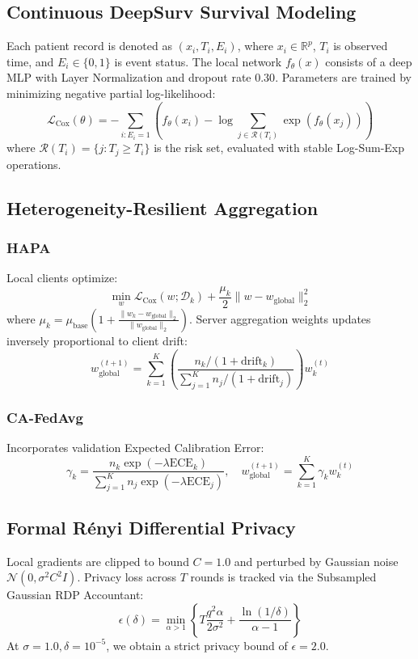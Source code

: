 \documentclass[journal,10pt,twocolumn]{IEEEtran}
\begin{document}
\subsection{Continuous DeepSurv Survival Modeling}
Each patient record is denoted as $(x_i, T_i, E_i)$, where $x_i \in \mathbb{R}^p$, $T_i$ is observed time, and $E_i \in \{0, 1\}$ is event status. The local network $f_\theta(x)$ consists of a deep MLP with Layer Normalization and dropout rate $0.30$. Parameters are trained by minimizing negative partial log-likelihood:
\begin{equation}
\mathcal{L}_{\text{Cox}}(\theta) = -\sum_{i: E_i=1} \left( f_\theta(x_i) - \log \sum_{j \in \mathcal{R}(T_i)} \exp(f_\theta(x_j)) \right)
\end{equation}
where $\mathcal{R}(T_i) = \{j : T_j \ge T_i\}$ is the risk set, evaluated with stable Log-Sum-Exp operations.

\subsection{Heterogeneity-Resilient Aggregation}
\subsubsection{HAPA} Local clients optimize:
\begin{equation}
\min_{w} \mathcal{L}_{\text{Cox}}(w; \mathcal{D}_k) + \frac{\mu_k}{2} \|w - w_{\text{global}}\|_2^2
\end{equation}
where $\mu_k = \mu_{\text{base}} \left(1 + \frac{\|w_k - w_{\text{global}}\|_2}{\|w_{\text{global}}\|_2}\right)$. Server aggregation weights updates inversely proportional to client drift:
\begin{equation}
w_{\text{global}}^{(t+1)} = \sum_{k=1}^K \left( \frac{n_k / (1 + \text{drift}_k)}{\sum_{j=1}^K n_j / (1 + \text{drift}_j)} \right) w_k^{(t)}
\end{equation}

\subsubsection{CA-FedAvg} Incorporates validation Expected Calibration Error:
\begin{equation}
\gamma_k = \frac{n_k \exp(-\lambda \text{ECE}_k)}{\sum_{j=1}^K n_j \exp(-\lambda \text{ECE}_j)}, \quad w_{\text{global}}^{(t+1)} = \sum_{k=1}^K \gamma_k w_k^{(t)}
\end{equation}

\subsection{Formal R\'enyi Differential Privacy}
Local gradients are clipped to bound $C=1.0$ and perturbed by Gaussian noise $\mathcal{N}(0, \sigma^2 C^2 I)$. Privacy loss across $T$ rounds is tracked via the Subsampled Gaussian RDP Accountant:
\begin{equation}
\epsilon(\delta) = \min_{\alpha > 1} \left\{ T \frac{q^2 \alpha}{2 \sigma^2} + \frac{\ln(1/\delta)}{\alpha - 1} \right\}
\end{equation}
At $\sigma = 1.0, \delta = 10^{-5}$, we obtain a strict privacy bound of $\epsilon = 2.0$.
\end{document}
